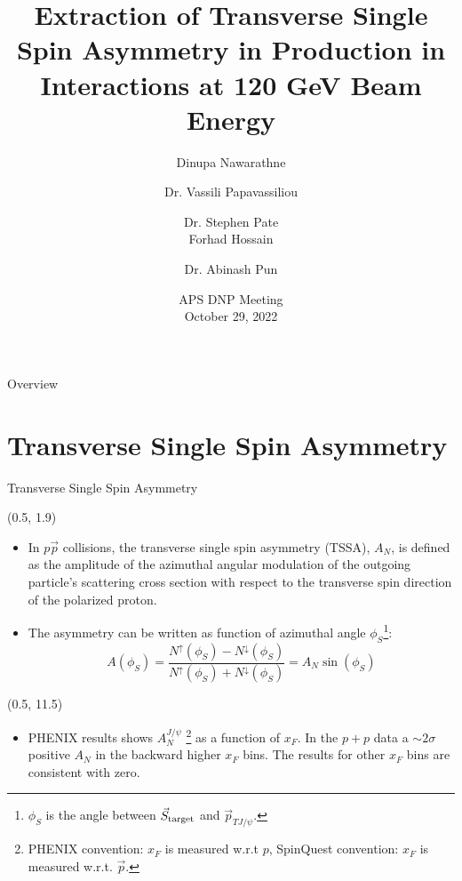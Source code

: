 \documentclass[10pt, xcolor={dvipsnames}, aspectratio = 169]{beamer}
\title{Extraction of Transverse Single Spin Asymmetry in \jpsi Production in \pp Interactions at 120 GeV Beam Energy}
\author{Dinupa Nawarathne  \and Dr. Vassili Papavassiliou \and Dr. Stephen Pate \\ Forhad Hossain \and Dr. Abinash Pun}
\institute{New Mexico State University \\
Representing the E-1039/SpinQuest
Collaboration}
\date{APS DNP Meeting
\\ October 29, 2022 }
\newcommand{\citeme}[1]{{\tiny \footfullcite{#1}}}
\newcommand{\pp}{$p\vec{p}$ }
\begin{document}
%
%
\begin{frame}
\maketitle
\end{frame}

%
%
\begin{frame}{Overview}
\tableofcontents
\end{frame}

%
%
\section{Transverse Single Spin Asymmetry}

\begin{frame}{Transverse Single Spin Asymmetry}

\begin{textblock}{8.0}(0.5, 1.9)

\begin{itemize}

\item In \pp collisions, the transverse single spin asymmetry (TSSA), $A_{N}$, is defined as the amplitude of the
azimuthal angular modulation of the outgoing particle’s scattering cross section with respect to the transverse spin
direction of the polarized proton.

\item The asymmetry can be written as function of azimuthal angle $\phi_{S}$\footnote{\tiny {$\phi_{S}$ is the angle
between $\vec{S}_{\rm target}$ and $\vec{p}_{TJ/\psi}$}.}:
%
\begin{equation*}
    A(\phi_{S}) = \frac{N^{\uparrow}(\phi_{S}) - N^{\downarrow}(\phi_{S})}{N^{\uparrow}(\phi_{S}) + N^{\downarrow}(\phi_{S})} = A_{N}\sin(\phi_{S})
\end{equation*}
%
%
\end{itemize}
\end{textblock}

\begin{textblock}{15.0}(0.5, 11.5)
\begin{itemize}
\item PHENIX results\citeme{PHENIX:2018qvl} shows $A_{N}^{J/\psi}$ \footnote{\tiny{PHENIX convention: $x_{F}$ is measured w.r.t $p$, SpinQuest convention: $x_{F}$ is measured w.r.t. $\vec{p}$.}} as a function of $x_{F}$. In the $p+p$ data a $\sim 2\sigma$ positive $A_{N}$ in the backward higher $x_{F}$ bins. The results for other $x_{F}$ bins are consistent with zero.
\end{itemize}
\end{textblock}


\end{frame}
\end{document}

